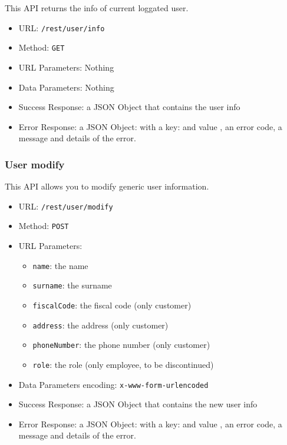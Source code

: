This API returns the info of current loggated user.

\begin{itemize}
    \item URL: \texttt{/rest/user/info}
    \item Method: \texttt{GET}
    \item URL Parameters: Nothing
    \item Data Parameters: Nothing
    \item Success Response: a JSON Object that contains the user info
    \item Error Response: a JSON Object: with a key:   and value , an error code, a message and details of the error.
\end{itemize}


\subsubsection*{User modify}

This API allows you to modify generic user information.

\begin{itemize}
    \item URL: \texttt{/rest/user/modify}
    \item Method: \texttt{POST}
    \item URL Parameters:
    \begin{itemize}
        \item \texttt{name}: the name
        \item \texttt{surname}: the surname
        \item \texttt{fiscalCode}: the fiscal code (only customer)
        \item \texttt{address}: the address (only customer)
        \item \texttt{phoneNumber}: the phone number (only customer)
        \item \texttt{role}: the role (only employee, to be discontinued)
    \end{itemize}
    \item Data Parameters encoding: \texttt{x-www-form-urlencoded}
    \item Success Response: a JSON Object that contains the new user info
    \item Error Response: a JSON Object: with a key:   and value , an error code, a message and details of the error.
\end{itemize}


